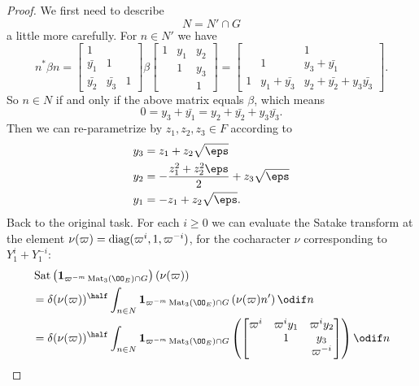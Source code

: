 \begin{proof}
  We first need to describe \[ N = N' \cap G \] a little more carefully.
  For $n \in N'$ we have
  \[
    n^\ast \beta n
    =
    \begin{bmatrix} 1 \\ \bar{y_1} & 1 \\ \bar{y_2} & \bar{y_3} & 1 \end{bmatrix}
    \beta
    \begin{bmatrix}
      1 & y_1 & y_2 \\
        & 1 & y_3 \\
        & & 1
    \end{bmatrix}
    = \begin{bmatrix}
      & & 1 \\
      & 1 & y_3 + \bar{y_1} \\
      1 & y_1 + \bar{y_3} & y_2 + \bar{y_2} + y_3 \bar{y_3}
    \end{bmatrix}.
  \]
  So $n \in N$ if and only if the above matrix equals $\beta$, which means
  \[ 0 = y_3 + \bar{y_1} = y_2 + \bar{y_2} + y_3 \bar{y_3}. \]
  Then we can re-parametrize by $z_1, z_2, z_3 \in F$ according to
  \begin{align*}
    y_3 &= z_1 + z_2 \sqrt\eps \\
    y_2 &= -\frac{z_1^2 + z_2^2 \eps}{2} + z_3\sqrt\eps \\
    y_1 &= -z_1 + z_2\sqrt\eps.
  \end{align*}
  Back to the original task.
  For each $i \ge 0$ we can evaluate the Satake transform at the element
  $\nu(\varpi) = \operatorname{diag}(\varpi^i, 1, \varpi^{-i})$, for the cocharacter $\nu$
  corresponding to $Y_1^i + Y_1^{-i}$:
  \begin{align*}
    &\Sat\left( \mathbf{1}_{\varpi^{-m} \Mat_3(\OO_E) \cap G}\right)
      \left( \nu(\varpi)  \right) \\
    &= \delta(\nu(\varpi))^\half \int_{n \in N}
      \mathbf{1}_{\varpi^{-m} \Mat_3(\OO_E) \cap G}
      \left( \nu(\varpi) n' \right) \odif n \\
    &= \delta(\nu(\varpi))^\half \int_{n \in N}
      \mathbf{1}_{{\varpi^{-m}} \Mat_3(\OO_E) \cap G}
      \left( \begin{bmatrix} \varpi^i & \varpi^i y_1 & \varpi^i y_2 \\
               & 1 & y_3 \\
               & & \varpi^{-i} \end{bmatrix} \right) \odif n
  \end{align*}

\end{proof}
